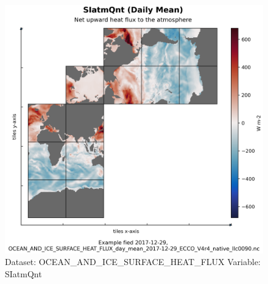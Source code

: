 \begin{figure}[H]
\centering
\includegraphics[width=\textwidth]{../images/plots/native_plots/Ocean_and_Sea-Ice_Surface_Heat_Fluxes/SIatmQnt.png}
\caption{Dataset: OCEAN\_AND\_ICE\_SURFACE\_HEAT\_FLUX Variable: SIatmQnt}
\label{tab:table-OCEAN_AND_ICE_SURFACE_HEAT_FLUX_SIatmQnt-Plot}
\end{figure}
\pagebreak
